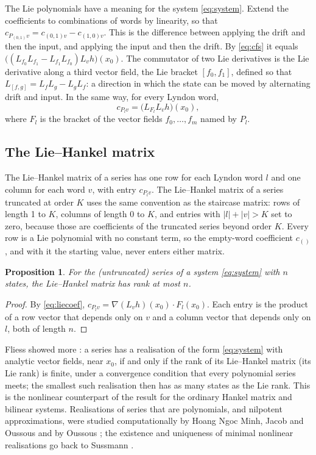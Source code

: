 \documentclass[11pt,a4paper]{article}
\newtheorem{proposition}{Proposition}
\theoremstyle{remark}
\begin{document}
The Lie polynomials have a meaning for the system \eqref{eq:system}.
Extend the coefficients to combinations of words by linearity, so that $c_{P_{(0,1)}v}=c_{(0,1)v}-c_{(1,0)v}$.
This is the difference between applying the drift and then the input, and applying the input and then the drift.
By \eqref{eq:cfs} it equals $\bigl((L_{f_0}L_{f_1}-L_{f_1}L_{f_0})L_vh\bigr)(x_0)$.
The commutator of two Lie derivatives is the Lie derivative along a third vector field, the Lie bracket $[f_0,f_1]$, defined so that $L_{[f,g]}=L_fL_g-L_gL_f$: a direction in which the state can be moved by alternating drift and input.
In the same way, for every Lyndon word,
\begin{equation}\label{eq:liecoef}
c_{P_lv}=\bigl(L_{F_l}L_vh\bigr)(x_0),
\end{equation}
where $F_l$ is the bracket of the vector fields $f_0,\dots,f_m$ named by $P_l$.

\subsection{The Lie--Hankel matrix}
The Lie--Hankel matrix of a series has one row for each Lyndon word $l$ and one column for each word $v$, with entry $c_{P_lv}$.
The Lie--Hankel matrix of a series truncated at order $K$ uses the same convention as the staircase matrix: rows of length 1 to $K$, columns of length 0 to $K$, and entries with $|l|+|v|>K$ set to zero, because those are coefficients of the truncated series beyond order $K$.
Every row is a Lie polynomial with no constant term, so the empty-word coefficient $c_{()}$, and with it the starting value, never enters either matrix.

\begin{proposition}\label{prop:lie}
For the (untruncated) series of a system \eqref{eq:system} with $n$ states, the Lie--Hankel matrix has rank at most $n$.
\end{proposition}
\begin{proof}
By \eqref{eq:liecoef}, $c_{P_lv}=\nabla(L_vh)(x_0)\cdot F_l(x_0)$.
Each entry is the product of a row vector that depends only on $v$ and a column vector that depends only on $l$, both of length $n$.
\end{proof}
Fliess showed more \cite{Fliess1983}: a series has a realisation of the form \eqref{eq:system} with analytic vector fields, near $x_0$, if and only if the rank of its Lie--Hankel matrix (its Lie rank) is finite, under a convergence condition that every polynomial series meets; the smallest such realisation then has as many states as the Lie rank.
This is the nonlinear counterpart of the result for the ordinary Hankel matrix and bilinear systems.
Realisations of series that are polynomials, and nilpotent approximations, were studied computationally by Hoang Ngoc Minh, Jacob and Oussous \cite{HoangJacobOussous1991} and by Oussous \cite{Oussous1991a,Oussous1991b}; the existence and uniqueness of minimal nonlinear realisations go back to Sussmann \cite{Sussmann1977}.
\end{document}
